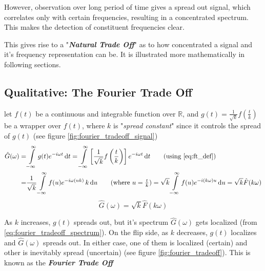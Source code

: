 \documentclass[11pt, a4paper]{article}
\newcommand{\diff}{\mathop{}\!\mathrm{d}}
\newcommand{\du}{\diff u}
\newcommand{\dt}{\diff t}
\newcommand{\dint}[2]{\int \limits_{#1}^{#2}}  %
\newcommand{\intinfty}{\dint{-\infty}{\infty}}	%
\begin{document}
However, observation over long period of time gives a spread out signal, which correlates only with certain frequencies, resulting in a concentrated spectrum. This makes the detection of constituent frequencies clear.

This gives rise to a "\textbf{\textit{Natural Trade Off}}" as to how concentrated a signal and it's frequency representation can be. It is illustrated more mathematically in following sections.

\subsection{Qualitative: The Fourier Trade Off}\label{sec:fourier_uncertainity_principle_qualitative}
let $f(t)$ be a continuous and integrable function over $\mathbb{R}$, and $g(t) = \frac{1}{\sqrt{k}} f \left( \frac{t}{k} \right)$ be a wrapper over $f(t)$, where $k$ is "\textit{spread constant}" since it controls the spread of $g(t)$ (see figure \ref{fig:fourier_tradeoff_signal})
\begin{align*}
	\hat{G}(\omega) = & \intinfty g(t) e^{-i \omega t} \dt
	= \intinfty \left[ \frac{1}{\sqrt{k}} f \left( \frac{t}{k} \right) \right] e^{-i \omega t} \dt  \tag{using \eqref{eq:ft_def}} \\
	= & \frac{1}{\sqrt{k}} \intinfty f(u) e^{-i \omega (uk)} \, k \du  \tag{where $u = \frac{t}{k}$} 
	= \sqrt{k} \intinfty f(u) e^{-i (k \omega) u} \du = \sqrt{k} \hat{F}(k \omega) 
\end{align*}
\begin{equation}\label{eq:fourier_tradeoff_spectrum}
	\boxed{
		\hat{G}(\omega) = \sqrt{k} \hat{F}(k \omega)
	}
\end{equation}

 As $k$ increases, $g(t)$ spreads out, but it's spectrum $\hat{G}(\omega)$ gets localized (from \eqref{eq:fourier_tradeoff_spectrum}). On the flip side, as $k$ decreases, $g(t)$ localizes and $\hat{G}(\omega)$ spreads out. In either case, one of them is localized (certain) and other is inevitably spread (uncertain) (see figure \ref{fig:fourier_tradeoff}). This is known as the \textbf{\textit{Fourier Trade Off}}
 
\end{document}
